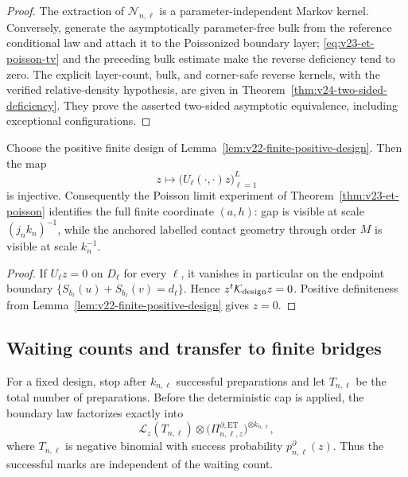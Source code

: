 \begin{proof}
The extraction of \(\mathcal N_{n,\ell}\) is a parameter-independent Markov
kernel.  Conversely, generate the asymptotically parameter-free bulk from the
reference conditional law and attach it to the Poissonized boundary layer;
\eqref{eq:v23-et-poisson-tv} and the preceding bulk estimate make the reverse
deficiency tend to zero.  The explicit layer-count, bulk, and corner-safe reverse kernels, with
the verified relative-density hypothesis, are given in
Theorem~\ref{thm:v24-two-sided-deficiency}.  They prove the asserted
two-sided asymptotic equivalence, including exceptional configurations.
\end{proof}

\begin{corollary}
\label{cor:v23-et-identification}
Choose the positive finite design of
Lemma~\ref{lem:v22-finite-positive-design}.  Then the map
\[
 z\longmapsto
 \bigl(U_\ell(\cdot,\cdot)z\bigr)_{\ell=1}^L
\]
is injective.  Consequently the Poisson limit experiment of
Theorem~\ref{thm:v23-et-poisson} identifies the full finite coordinate
\((a,h)\): gap is visible at scale \((j_nk_n)^{-1}\), while the anchored
labelled contact geometry through order \(M\) is visible at scale
\(k_n^{-1}\).
\end{corollary}

\begin{proof}
If \(U_\ell z=0\) on \(D_\ell\) for every \(\ell\), it vanishes in
particular on the endpoint boundary
\(\{S_{b_\ell}(u)+S_{b_\ell}(v)=d_\ell\}\).  Hence
\(z^t\mathcal K_{\rm design}z=0\).  Positive definiteness from
Lemma~\ref{lem:v22-finite-positive-design} gives \(z=0\).
\end{proof}

\subsection{Waiting counts and transfer to finite bridges}

For a fixed design, stop after \(k_{n,\ell}\) successful preparations and let
\(T_{n,\ell}\) be the total number of preparations.  Before the deterministic
cap is applied, the boundary law factorizes exactly into
\begin{equation}\label{eq:v23-et-factorization}
 \mathcal L_z(T_{n,\ell})
 \otimes
 \bigl(\Pi^{\partial,\mathrm{ET}}_{n,\ell,z}\bigr)^{\otimes k_{n,\ell}},
\end{equation}
where \(T_{n,\ell}\) is negative binomial with success probability
\(p^\partial_{n,\ell}(z)\).  Thus the successful marks are independent of the
waiting count.

